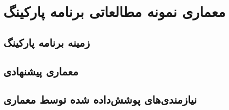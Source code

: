 \chapter{معماری نمونه مطالعاتی برنامه پارکینگ}

\section{زمینه برنامه‌ پارکینگ}

\section{معماری پیشنهادی}

\section{نیازمندی‌های پوشش‌داده شده توسط معماری}